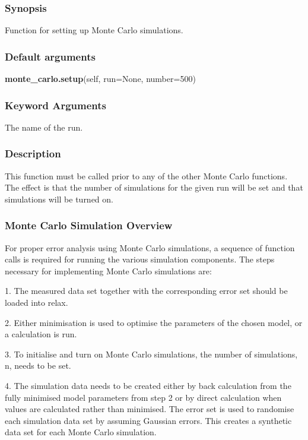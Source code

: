 \subsubsection{Synopsis}

Function for setting up Monte Carlo simulations.

\subsubsection{Default arguments}

\textsf{\textbf{monte\_carlo.setup}(self, run=None, number=500)}


\subsubsection{Keyword Arguments}

  The name of the run.


\subsubsection{Description}

This function must be called prior to any of the other Monte Carlo functions.  The effect is
that the number of simulations for the given run will be set and that simulations will be
turned on.



\subsubsection{Monte Carlo Simulation Overview}

For proper error analysis using Monte Carlo simulations, a sequence of function calls is
required for running the various simulation components.  The steps necessary for
implementing Monte Carlo simulations are:

1.  The measured data set together with the corresponding error set should be loaded into
relax.

2.  Either minimisation is used to optimise the parameters of the chosen model, or a
calculation is run.

3.  To initialise and turn on Monte Carlo simulations, the number of simulations, n, needs
to be set.

4.  The simulation data needs to be created either by back calculation from the fully
minimised model parameters from step 2 or by direct calculation when values are calculated
rather than minimised.  The error set is used to randomise each simulation data set by
assuming Gaussian errors.  This creates a synthetic data set for each Monte Carlo
simulation.

